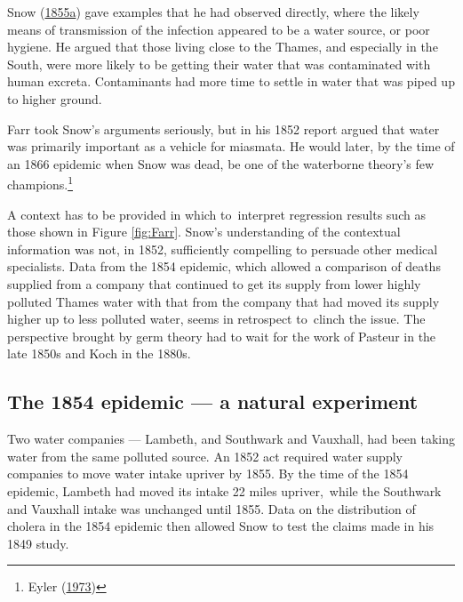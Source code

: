 \documentclass[
  10pt,
  b5paper]{book}
\begin{document}
Snow (\protect\hyperlink{ref-snow1849mode}{1855a}) gave examples that he had observed directly,
where the likely means of transmission of the infection
appeared to be a water source, or poor hygiene. He argued
that those living close to the Thames, and especially in
the South, were more likely to be getting their water
that was contaminated with human excreta. Contaminants had
more time to settle in water that was piped up to higher
ground.

Farr took Snow's arguments seriously, but in his 1852 report
argued that water was primarily important as a vehicle for
miasmata. He would later, by the time of an 1866 epidemic
when Snow was dead, be one of the waterborne theory's few
champions.\footnote{Eyler (\protect\hyperlink{ref-eyler1973william}{1973})}

A context has to be provided in which to~interpret regression
results such as those shown in Figure \ref{fig:Farr}.
Snow's understanding of the contextual information was not,
in 1852, sufficiently compelling to persuade other medical
specialists. Data from the 1854 epidemic, which allowed a
comparison of deaths supplied from a company that continued
to get its supply from lower highly polluted Thames water
with that from the company that had moved its supply higher
up to less polluted water, seems in retrospect to~clinch
the issue. The perspective brought by germ theory had to
wait for the work of Pasteur in the late 1850s and
Koch in the 1880s.

\hypertarget{the-1854-epidemic-a-natural-experiment}{%
\subsection*{The 1854 epidemic --- a natural experiment}\label{the-1854-epidemic-a-natural-experiment}}

Two water companies --- Lambeth, and Southwark and Vauxhall,
had been taking water from the same polluted source. An 1852
act required water supply companies to move water intake
upriver by 1855. By the time of the 1854 epidemic, Lambeth
had moved its intake 22 miles upriver,~while the Southwark
and Vauxhall intake was unchanged until 1855. Data on the
distribution of cholera in the 1854 epidemic then allowed
Snow to test the claims made in his 1849 study.

\end{document}
